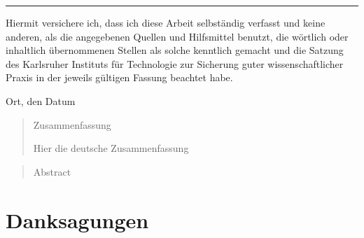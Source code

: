 \documentclass[12pt,a4paper,twoside]{scrartcl}
\numberwithin{equation}{section}
\begin{document}

\vspace*{0pt}\vfill

\hrule\medskip

Hiermit versichere ich, dass ich diese Arbeit selbständig verfasst und keine anderen, als die angegebenen Quellen und Hilfsmittel benutzt, die wörtlich oder inhaltlich übernommenen Stellen als solche kenntlich gemacht und die Satzung des Karlsruher Instituts für Technologie zur Sicherung guter wissenschaftlicher Praxis in der jeweils gültigen Fassung beachtet habe.

\bigskip

\noindent
Ort, den Datum


\vspace*{5cm}

\clearpage


\vspace*{0pt}\vfill

\begin{abstract}
\centerline{ Zusammenfassung}

Hier die deutsche Zusammenfassung

\end{abstract}

\vfill

\begin{abstract}
\centerline{ Abstract}

\end{abstract}

\vfill\vfill\vfill
\clearpage


\vspace*{0pt}\vfill

\section*{Danksagungen}


\vfill\vfill\vfill
\clearpage


\pagestyle{normal}
\renewcommand\sectionmark[1]{\markboth{\thesection\quad\MakeUppercase{#1}}{\thesection\quad\MakeUppercase{#1}}}
\renewcommand\subsectionmark[1]{\markright{\thesubsection\quad\MakeUppercase{#1}}}
\end{document}
